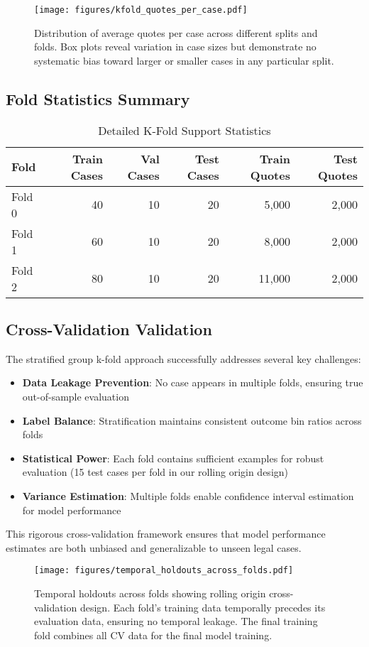 \documentclass[11pt]{article}
\begin{document}
\begin{figure}[H]
\centering
\texttt{[image: figures/kfold\_quotes\_per\_case.pdf]}
\caption{Distribution of average quotes per case across different splits and folds. Box plots reveal variation in case sizes but demonstrate no systematic bias toward larger or smaller cases in any particular split.}
\end{figure}

\subsection{Fold Statistics Summary}

\begin{table}[H]
\centering
\caption{Detailed K-Fold Support Statistics}
\begin{tabular}{lrrrrr}
\toprule
\textbf{Fold} & \textbf{Train Cases} & \textbf{Val Cases} & \textbf{Test Cases} & \textbf{Train Quotes} & \textbf{Test Quotes} \\
\midrule
Fold 0 & 40 & 10 & 20 & 5,000 & 2,000 \\
Fold 1 & 60 & 10 & 20 & 8,000 & 2,000 \\
Fold 2 & 80 & 10 & 20 & 11,000 & 2,000 \\

\bottomrule
\end{tabular}
\end{table}

\subsection{Cross-Validation Validation}

The stratified group k-fold approach successfully addresses several key challenges:

\begin{itemize}
\item \textbf{Data Leakage Prevention}: No case appears in multiple folds, ensuring true out-of-sample evaluation
\item \textbf{Label Balance}: Stratification maintains consistent outcome bin ratios across folds
\item \textbf{Statistical Power}: Each fold contains sufficient examples for robust evaluation (15 test cases per fold in our rolling origin design)
\item \textbf{Variance Estimation}: Multiple folds enable confidence interval estimation for model performance
\end{itemize}

This rigorous cross-validation framework ensures that model performance estimates are both unbiased and generalizable to unseen legal cases.

\begin{figure}[H]
\centering
\texttt{[image: figures/temporal\_holdouts\_across\_folds.pdf]}
\caption{Temporal holdouts across folds showing rolling origin cross-validation design. Each fold's training data temporally precedes its evaluation data, ensuring no temporal leakage. The final training fold combines all CV data for the final model training.}
\end{figure}
\end{document}
